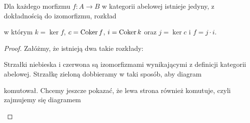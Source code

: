 \begin{uwaga}\label{uwaga 5.1}
  Dla każdego morfizmu $f:A\to B$ w kategorii abelowej istnieje jedyny, z dokładnością do izomorfizmu, rozkład
  
  \begin{center}\end{center}
  
  w którym $k=\ker f$, $c=\operatorname{Coker} f$, $i=\operatorname{Coker} k$ oraz $j=\ker c$ i $f=j\cdot i$.
\end{uwaga}

\begin{proof}
  Załóżmy, że istnieją dwa takie rozkłady:
  
  \begin{center}\end{center}
  Strzałki {\color{blue}niebieska} i {\color{red}czerwona} są izomorfizmami wynikającymi z definicji kategorii abelowej. Strzałkę {\color{green}zieloną} dobbieramy w taki sposób, aby diagram
  
  \begin{center}\end{center}
  komutował. Chcemy jeszcze pokazać, że lewa strona również komutuje, czyli zajmujemy się diagramem

  \begin{center}\end{center}

\end{proof}

